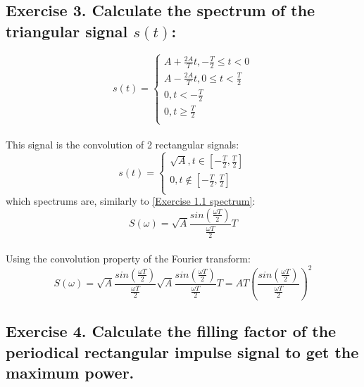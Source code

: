 \documentclass[14pt]{article}
\begin{document}
\subsection{Exercise 3. Calculate the spectrum of the triangular
	signal $ s(t) $:}
\begin{equation}
	s(t)
	=
	\left\{  
	\begin{array}{rcl}  
		A + \frac{2 A}{T} t, -\frac{T}{2} \leq t < 0\\  
		A - \frac{2 A}{T} t, 0 \leq t < \frac{T}{2}\\  
		0, t < -\frac{T}{2}\\   
		0, t \geq \frac{T}{2}\\  
	\end{array}
	\right.
\end{equation}

\paragraph{}
This signal is the convolution of 2 rectangular signals:
\begin{equation}
	s(t) 
	=
	\left\{  
	\begin{array}{rcl}  
		\sqrt{A}, t \in [-\frac{T}{2}, \frac{T}{2}]\\  
		0, t \notin [-\frac{T}{2}, \frac{T}{2}]\\  
	\end{array}
	\right.  
\end{equation}
which spectrums are, similarly to \eqref{Exercise 1.1 spectrum}:
\begin{equation}
	S(\omega)
	=
	\sqrt{A} \frac{sin(\frac{\omega T}{2})} {\frac{\omega T}{2}} T
\end{equation}

\paragraph{}
Using the convolution property of the Fourier transform:
\begin{equation}
	S(\omega)
	=
	\sqrt{A} \frac{sin(\frac{\omega T}{2})} {\frac{\omega T}{2}} 
	\sqrt{A} \frac{sin(\frac{\omega T}{2})} {\frac{\omega T}{2}} T 
	=
	A T (\frac{sin(\frac{\omega T}{2})}{\frac{\omega T}{2}})^2
\end{equation}

\subsection{Exercise 4. Calculate the filling factor of the
	periodical rectangular impulse signal to get the maximum power.}
\end{document}
